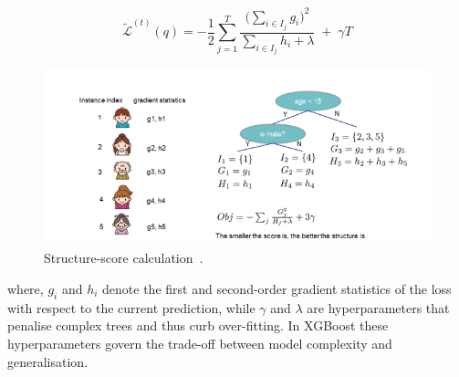 \documentclass{SGGW-thesis-EN}
\begin{document}
\begin{figure}[h!]
  \centering
  \begin{minipage}[c]{0.45\textwidth}
    \[
      \tilde{\mathcal{L}}^{(t)}(q) =
      -\frac{1}{2}\sum_{j=1}^{T}
      \frac{\bigl(\sum_{i \in I_j} g_i\bigr)^2}
           {\sum_{i \in I_j} h_i + \lambda}
      \;+\; \gamma T
    \] 
  \end{minipage}\hfill
  \begin{minipage}[c]{0.55\textwidth}
    \centering
    \includegraphics[width=\linewidth]{images/structure_score_calculation.png}
    \caption{Structure-score calculation~\cite{Chen_2016}.}
    \label{fig:structure_score_calculation}
  \end{minipage}
\end{figure}
\noindent where, \(g_i\) and \(h_i\) denote the first and second-order gradient statistics of the loss with
respect to the current prediction, while \(\gamma\) and \(\lambda\) are hyperparameters that penalise
complex trees and thus curb over-fitting.
In XGBoost these hyperparameters govern the trade-off between model complexity and
generalisation.
\end{document}
